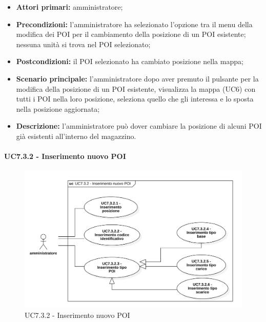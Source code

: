 \begin{itemize}

\item   \textbf{Attori primari:} amministratore;

\item   \textbf{Precondizioni:} l'amministratore ha selezionato l'opzione tra il menu della modifica dei POI per il cambiamento della posizione di un POI esistente; nessuna unità si trova nel POI selezionato;

 \item   \textbf{Postcondizioni:} il POI selezionato ha cambiato posizione nella mappa; 

\item   \textbf{Scenario principale:} l'amministratore dopo aver premuto il pulsante per la modifica della posizione di un POI esistente, visualizza la mappa (UC6) con tutti i POI nella loro posizione, seleziona quello che gli interessa e lo sposta nella posizione aggiornata;
   \item   \textbf{Descrizione:} l'amministratore può dover cambiare la posizione di alcuni POI già esistenti all'interno del magazzino.

\end{itemize}



\paragraph{UC7.3.2 - Inserimento nuovo POI}

\begin{figure}[H]

  \centering

   \includegraphics[scale=0.52]{res/images/uc7-3-2.png}

  \caption{UC7.3.2 - Inserimento nuovo POI}

\end{figure}



